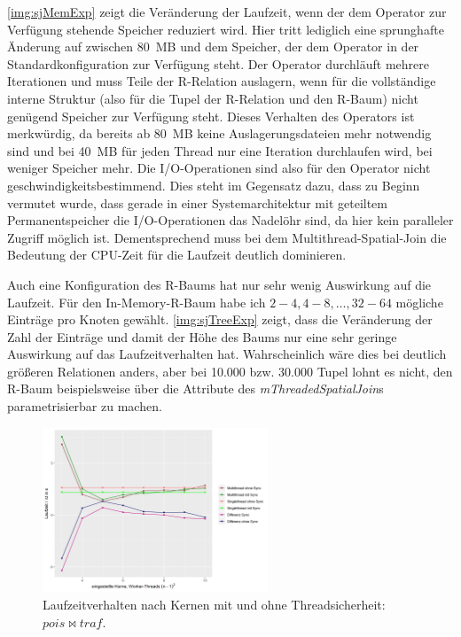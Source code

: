 \documentclass[a4paper,12pt,twoside]{article}
\newcommand{\Fb}[1]{\textit{#1}} %
\begin{document}
\autoref{img:sjMemExp} zeigt die Veränderung der Laufzeit, wenn der dem Operator zur Verfügung stehende Speicher reduziert wird. Hier tritt lediglich eine sprunghafte Änderung auf zwischen 80~MB und dem Speicher, der dem Operator in der Standardkonfiguration zur Verfügung steht. Der Operator durchläuft mehrere Iterationen und muss Teile der R-Relation auslagern, wenn für die vollständige interne Struktur (also für die Tupel der R-Relation und den R-Baum) nicht genügend Speicher zur Verfügung steht. Dieses Verhalten des Operators ist merkwürdig, da bereits ab 80~MB keine Auslagerungsdateien mehr notwendig sind und bei 40~MB für jeden Thread nur eine Iteration durchlaufen wird, bei weniger Speicher mehr. Die I/O-Operationen sind also für den Operator nicht geschwindigkeitsbestimmend. Dies steht im Gegensatz dazu, dass zu Beginn vermutet wurde, dass gerade in einer Systemarchitektur mit geteiltem Permanentspeicher die I/O-Operationen das Nadelöhr sind, da hier kein paralleler Zugriff möglich ist. Dementsprechend muss bei dem Multithread-Spatial-Join die Bedeutung der CPU-Zeit für die Laufzeit deutlich dominieren.

Auch eine Konfiguration des R-Baums hat nur sehr wenig Auswirkung auf die Laufzeit. Für den In-Memory-R-Baum habe ich $2-4, 4-8, \ldots, 32-64$ mögliche Einträge pro Knoten gewählt. \autoref{img:sjTreeExp} zeigt, dass die Veränderung der Zahl der Einträge und damit der Höhe des Baums nur eine sehr geringe Auswirkung auf das Laufzeitverhalten hat. Wahrscheinlich wäre dies bei deutlich größeren Relationen anders, aber bei 10.000 bzw. 30.000 Tupel lohnt es nicht, den R-Baum beispielsweise über die Attribute des \Fb{mThreadedSpatialJoin}s parametrisierbar zu machen.   

\begin{figure}
	\centering
	\includegraphics[width=0.6\textwidth]{Bilder/sj_nosync.png}
	\caption{Laufzeitverhalten nach Kernen mit und ohne Threadsicherheit: $pois \bowtie traf$.}
	\label{img:sjSync}
\end{figure}
\end{document}
